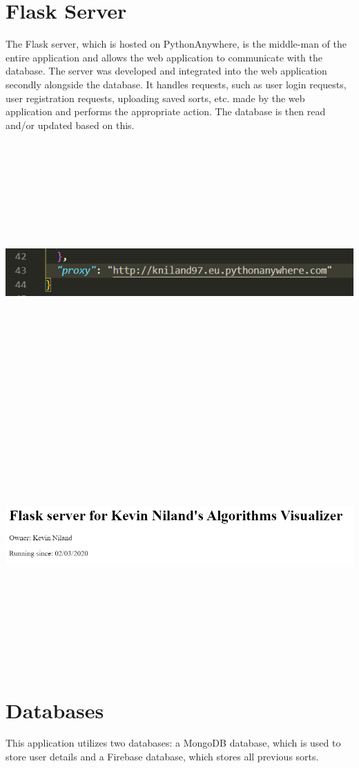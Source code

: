 \section{Flask Server}
The Flask server, which is hosted on PythonAnywhere, is the middle-man of the entire application and allows the web application to communicate with the database. The server was developed and integrated into the web application secondly alongside the database. It handles requests, such as user login requests, user registration requests, uploading saved sorts, etc. made by the web application and performs the appropriate action. The database is then read and/or updated based on this. 

\begin{center}
    \includegraphics[width=15cm,height=10cm,keepaspectratio]{images/proxy}
    \includegraphics[width=15cm,height=10cm,keepaspectratio]{images/pa_kn}
\end{center}

\section{Databases}
This application utilizes two databases: a MongoDB database, which is used to store user details and a Firebase database, which stores all previous sorts. 